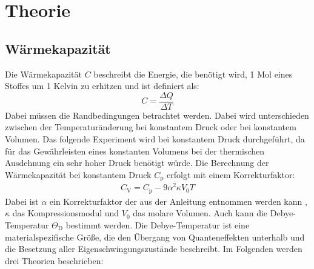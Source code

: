 
\section{Theorie}
\label{sec:Theorie}
\subsection{Wärmekapazität}
\label{sec:Wärmekapazität}
Die Wärmekapazität $C$ beschreibt die Energie, die benötigt wird, 1 Mol eines Stoffes um 1 Kelvin zu erhitzen und ist definiert als:
\begin{equation}
  \label{eqn:Wärmekapazität}
  C=\dfrac{\Delta Q}{\Delta T}
\end{equation}
Dabei müssen die Randbedingungen betrachtet werden. Dabei wird unterschieden zwischen der Temperaturänderung bei konstantem Druck oder bei konstantem Volumen. Das folgende Experiment wird bei konstantem Druck durchgeführt, da für das Gewährleisten eines konstanten Volumens bei der thermischen Ausdehnung ein sehr hoher Druck benötigt würde. Die Berechnung der Wärmekapazität bei konstantem Druck $C_\mathrm{p}$ erfolgt mit einem Korrekturfaktor:
\begin{align}
  \label{eqn:cv}
 C_\mathrm{V} = C_\mathrm{p}-9\alpha^2\kappa V_\mathrm{0}T
\end{align}
Dabei ist $\alpha$ ein Korrekturfaktor der aus der Anleitung entnommen werden kann \cite[3]{Anleitung}, $\kappa$ das Kompressionsmodul und $V_\mathrm{0}$ das molare Volumen.
Auch kann die Debye-Temperatur $\Theta_\mathrm{D}$ bestimmt werden. Die Debye-Temperatur ist eine materialspezifische Größe, die den Übergang von Quanteneffekten unterhalb und die Besetzung aller Eigenschwingungszustände beschreibt.
Im Folgenden werden drei Theorien beschrieben:
